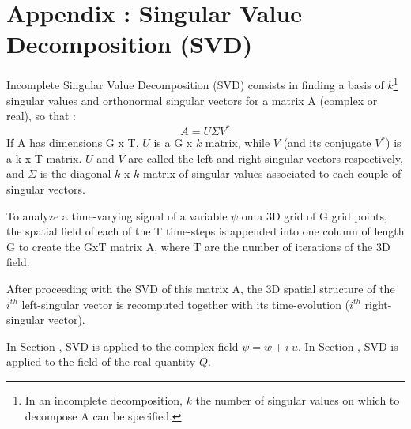 \color{black}


\section{Appendix : Singular Value Decomposition (SVD)}
\label{annexeSVD}
Incomplete Singular Value Decomposition (SVD) consists in finding a basis of $k$\footnote{In an incomplete decomposition, $k$ the number of singular values on which to decompose A can be specified.} singular values and orthonormal singular vectors for a matrix A (complex or real), so that :
\begin{equation}
A = U \Sigma V^* 
\end{equation}
If A has dimensions G x T, $U$ is a G x $k$ matrix, while $V$ (and its conjugate $V^*$) is a k x T matrix. $U$ and $V$ are called the left and right singular vectors respectively, and $\Sigma$ is the diagonal $k$ x $k$ matrix of singular values associated to each couple of singular vectors.

To analyze a time-varying signal of a variable $\psi$ on a 3D grid of G grid points, the spatial field of each of the T time-steps is appended into one column of length G to create the GxT matrix A, where T are the number of iterations of the 3D field. 

After proceeding with the SVD of this matrix A, the 3D spatial structure of the $i^{th}$ left-singular vector is recomputed together with its time-evolution ($i^{th}$ right-singular vector).

In Section , SVD is applied to the complex field $\psi=w+i\ u$. %
In Section , SVD is applied to the field of the real quantity $Q$.

